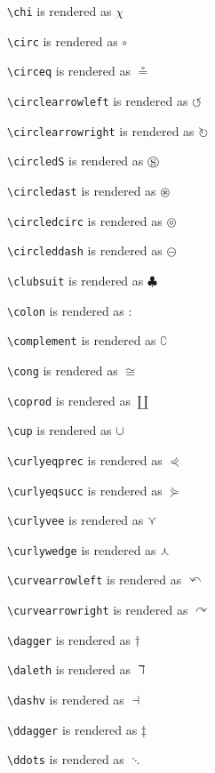 \texttt{\textbackslash chi} is rendered as $\chi$

\texttt{\textbackslash circ} is rendered as $\circ$

\texttt{\textbackslash circeq} is rendered as $\circeq$

\texttt{\textbackslash circlearrowleft} is rendered as $\circlearrowleft$

\texttt{\textbackslash circlearrowright} is rendered as $\circlearrowright$

\texttt{\textbackslash circledS} is rendered as $\circledS$

\texttt{\textbackslash circledast} is rendered as $\circledast$

\texttt{\textbackslash circledcirc} is rendered as $\circledcirc$

\texttt{\textbackslash circleddash} is rendered as $\circleddash$

\texttt{\textbackslash clubsuit} is rendered as $\clubsuit$

\texttt{\textbackslash colon} is rendered as $\colon$

\texttt{\textbackslash complement} is rendered as $\complement$

\texttt{\textbackslash cong} is rendered as $\cong$

\texttt{\textbackslash coprod} is rendered as $\coprod$

\texttt{\textbackslash cup} is rendered as $\cup$

\texttt{\textbackslash curlyeqprec} is rendered as $\curlyeqprec$

\texttt{\textbackslash curlyeqsucc} is rendered as $\curlyeqsucc$

\texttt{\textbackslash curlyvee} is rendered as $\curlyvee$

\texttt{\textbackslash curlywedge} is rendered as $\curlywedge$

\texttt{\textbackslash curvearrowleft} is rendered as $\curvearrowleft$

\texttt{\textbackslash curvearrowright} is rendered as $\curvearrowright$

\texttt{\textbackslash dagger} is rendered as $\dagger$

\texttt{\textbackslash daleth} is rendered as $\daleth$

\texttt{\textbackslash dashv} is rendered as $\dashv$

\texttt{\textbackslash ddagger} is rendered as $\ddagger$

\texttt{\textbackslash ddots} is rendered as $\ddots$

